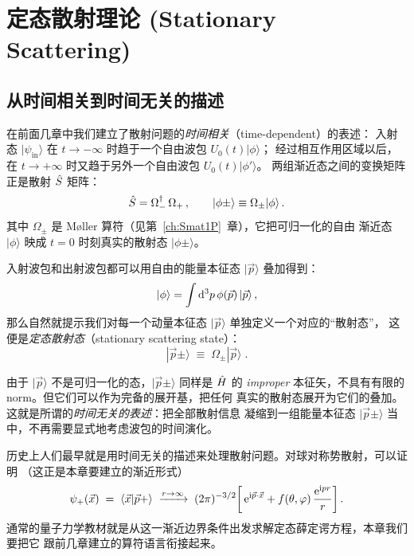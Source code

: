 \chapter{定态散射理论 (Stationary Scattering)}\label{ch:stationary}

\section{从时间相关到时间无关的描述}

在前面几章中我们建立了散射问题的\emph{时间相关}（time-dependent）的表述：
入射态 $|\psi_{\text{in}}\rangle$ 在 $t\to-\infty$ 时趋于一个自由波包 $U_0(t)|\phi\rangle$；
经过相互作用区域以后，在 $t\to+\infty$ 时又趋于另外一个自由波包 $U_0(t)|\phi'\rangle$。
两组渐近态之间的变换矩阵正是散射 $\hat{S}$ 矩阵：
\begin{equation}
  \hat{S} = \Omega_-^\dagger\,\Omega_+\,,
  \qquad
  |\phi\pm\rangle \equiv \Omega_\pm |\phi\rangle\,.
\end{equation}
其中 $\Omega_\pm$ 是 M\o ller 算符（见第~\ref{ch:Smat1P}~章），它把可归一化的自由
渐近态 $|\phi\rangle$ 映成 $t=0$ 时刻真实的散射态 $|\phi\pm\rangle$。

入射波包和出射波包都可以用自由的能量本征态 $|\vec p\rangle$ 叠加得到：
\begin{equation}
  |\phi\rangle = \int \mathrm{d}^3 p\, \phi(\vec p)\,|\vec p\rangle\,,
\end{equation}
那么自然就提示我们对每一个动量本征态 $|\vec p\rangle$ 单独定义一个对应的``散射态''，
这便是\emph{定态散射态}（stationary scattering state）：
\begin{equation}
  \boxed{\;|\vec p\pm\rangle \;\equiv\; \Omega_\pm |\vec p\rangle\;.\;}
  \label{eq:def-ppm}
\end{equation}

由于 $|\vec p\rangle$ 不是可归一化的态，$|\vec p\pm\rangle$ 同样是 $\hat{H}$ 的
\emph{improper} 本征矢，不具有有限的 norm。但它们可以作为完备的展开基，把任何
真实的散射态展开为它们的叠加。这就是所谓的\emph{时间无关的表述}：把全部散射信息
凝缩到一组能量本征态 $|\vec p\pm\rangle$ 当中，不再需要显式地考虑波包的时间演化。

历史上人们最早就是用时间无关的描述来处理散射问题。对球对称势散射，可以证明
（这正是本章要建立的渐近形式）
\begin{equation}
  \psi_+(\vec x) \;=\; \langle \vec x|\vec p+\rangle
  \;\xrightarrow{r\to\infty}\;
  (2\pi)^{-3/2}\!\left[\,\mathrm{e}^{\mathrm{i}\vec p\cdot\vec x}
  + f(\theta,\varphi)\,\frac{\mathrm{e}^{\mathrm{i} p r}}{r}\right].
  \label{eq:stationary-asymp-intro}
\end{equation}
通常的量子力学教材就是从这一渐近边界条件出发求解定态薛定谔方程，本章我们要把它
跟前几章建立的算符语言衔接起来。

